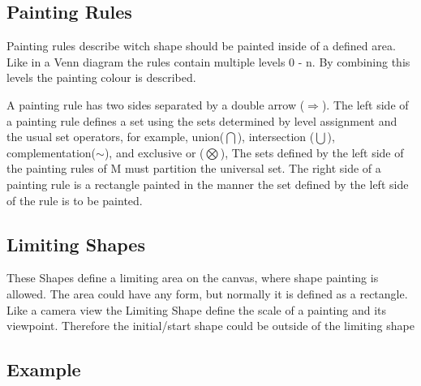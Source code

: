\documentclass[11pt, a4paper]{report}
\begin{document}
\subsection{Painting Rules}
\label{sec:Shape_Grammar_Painting_Rules}
Painting rules describe witch shape should be painted inside of a defined area. Like in a Venn diagram the rules contain multiple levels 0 - n. By combining this levels the painting colour is described\citep{shapeGrammars:1972}.
\begin{displayquote}
    A painting rule has two sides separated by a double arrow ($\Rightarrow$). The left side of a painting rule defines a set using the sets determined by level assignment and the usual set operators, for example, union($\bigcap$), intersection ($\bigcup$), complementation($\sim$), and exclusive or ($\bigotimes$), The sets defined by the left side of the painting rules of M must partition the universal set. The right side of a painting rule is a rectangle painted in the manner the set defined by the left side of the rule is to be painted.
\end{displayquote}

\subsection{Limiting Shapes}
\label{sec:Shape_Grammar_Limiting_Shapes}
These Shapes define a limiting area on the canvas, where shape painting is allowed. 
The area could have any form, but normally it is defined as a rectangle. Like a camera view the Limiting Shape define the scale of a painting and its viewpoint. Therefore the initial/start shape could be outside of the limiting shape 

\subsection{Example\citep{shapeGrammars:1972}}
\end{document}
